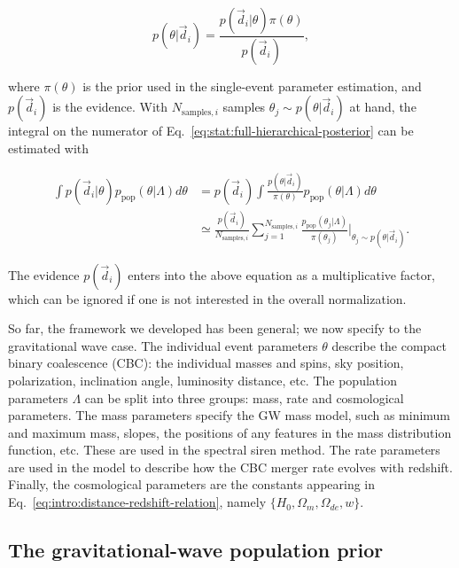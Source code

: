 \documentclass[%
preprint,
nofootinbib,
 amsmath,amssymb,
 aps,
]{revtex4-2}
\newcommand{\given}[2]{p( #1 | #2 )}
\newcommand{\ppop}[0]{p_{\text{pop}}}
\begin{document}
\begin{equation}
	\given{\theta}{\vec{d}_i} = \frac{\given{\vec{d}_i}{\theta} \pi(\theta)}{p(\vec{d}_i)},
\end{equation}

where $\pi(\theta)$ is the prior used in the single-event parameter estimation, and $p(\vec{d}_i)$
is the evidence. With $N_{\text{samples},i}$ samples $\theta_j \sim \given{\theta}{\vec{d}_i}$ at
hand, the integral on the numerator of Eq.~\eqref{eq:stat:full-hierarchical-posterior} can be
estimated with

\begin{align}
	\label{eq:stat:posterior-with-single-event-posterior-prior}
	\int \given{\vec{d}_i}{\theta} \ppop(\theta | \Lambda ) d\theta & = p(\vec{d}_i)\int \frac{\given{\theta}{\vec{d}_i}}{\pi(\theta)} \ppop(\theta | \Lambda ) d\theta                                                                                     \\
	\label{eq:stat:posterior-monte-carlo-sum}
	                                                                & \simeq \frac{p(\vec{d}_i)}{N_{\text{samples},i}} \sum_{j=1}^{N_{\text{samples},i}} \frac{\ppop(\theta_j | \Lambda )}{\pi(\theta_j)} \Big |_{\theta_j \sim \given{\theta}{\vec{d}_i}}.
\end{align}

The evidence $p(\vec{d}_i)$ enters into the above equation as a multiplicative factor, which can be
ignored if one is not interested in the overall normalization.

So far, the framework we developed has been general; we now specify to the gravitational wave case.
The individual event parameters $\theta$ describe the compact binary coalescence (CBC): the
individual masses and spins, sky position, polarization, inclination angle, luminosity distance,
etc. The population parameters $\Lambda$ can be split into three groups: mass, rate and
cosmological parameters. The mass parameters specify the GW mass model, such as minimum and maximum
mass, slopes, the positions of any features in the mass distribution function, etc. These are used
in the spectral siren method. The rate parameters are used in the model to describe how the CBC
merger rate evolves with redshift. Finally, the cosmological parameters are the constants appearing
in Eq.~\eqref{eq:intro:distance-redshift-relation}, namely $\{H_0, \Omega_m, \Omega_{de}, w\}$.

\subsection{The gravitational-wave population prior}
\label{sec:population-prior}
\end{document}
